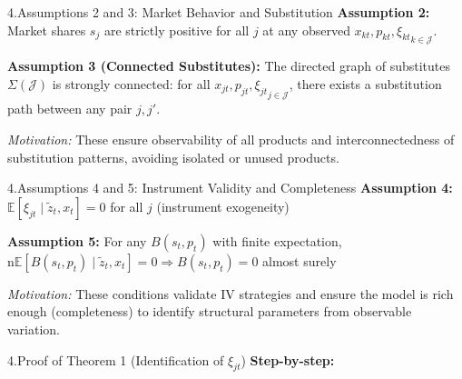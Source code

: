 \documentclass[aspectratio=169]{beamer}  %
\begin{document}
\begin{frame}{4.Assumptions 2 and 3: Market Behavior and Substitution}
\textbf{Assumption 2:} Market shares $s_j$ are strictly positive for all $j$ at any observed ${x_{kt}, p_{kt}, \xi_{kt}}_{k \in \mathcal{J}}$.

\vspace{0.3cm}
\textbf{Assumption 3 (Connected Substitutes):} The directed graph of substitutes $\Sigma(\mathcal{J})$ is strongly connected: for all ${x_{jt}, p_{jt}, \xi_{jt}}_{j \in \mathcal{J}}$, there exists a substitution path between any pair $j, j'$.

\vspace{0.3cm}
\textit{Motivation:} These ensure observability of all products and interconnectedness of substitution patterns, avoiding isolated or unused products.
\end{frame}

\begin{frame}{4.Assumptions 4 and 5: Instrument Validity and Completeness}
\textbf{Assumption 4:} \quad $\mathbb{E}[\xi_{jt} \mid \tilde{z}_t, x_t] = 0$ \quad for all $j$ (instrument exogeneity)

\vspace{0.3cm}
\textbf{Assumption 5:} \quad For any $B(s_t, p_t)$ with finite expectation, \\n$\mathbb{E}[B(s_t, p_t) \mid \tilde{z}_t, x_t] = 0 \Rightarrow B(s_t, p_t) = 0$ almost surely

\vspace{0.3cm}
\textit{Motivation:} These conditions validate IV strategies and ensure the model is rich enough (completeness) to identify structural parameters from observable variation.
\end{frame}

\begin{frame}{4.Proof of Theorem 1 (Identification of \(\xi_{jt}\))}
\textbf{Step-by-step:}
\end{frame}
\end{document}
